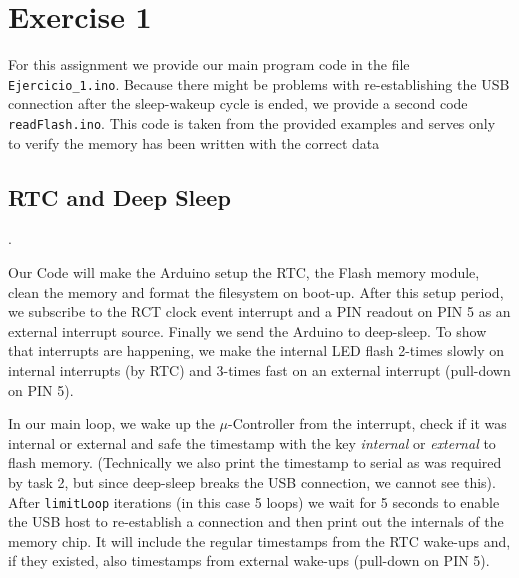 \chapter*{Exercise 1}

For this assignment we provide our main program code in the file \texttt{Ejercicio\_1.ino}. Because there might be problems with re-establishing the USB connection after the sleep-wakeup cycle is ended, we provide a second code \texttt{readFlash.ino}. This code is taken from the provided examples and serves only to verify the memory has been written with the correct data

\section*{RTC and Deep Sleep}.

Our Code will make the Arduino setup the RTC, the Flash memory module, clean the memory and format the filesystem on boot-up. After this setup period, we subscribe to the RCT clock event interrupt and a PIN readout on PIN 5 as an external interrupt source. Finally we send the Arduino to deep-sleep.
To show that interrupts are happening, we make the internal LED flash 2-times slowly on internal interrupts (by RTC) and 3-times fast on an external interrupt (pull-down on PIN 5).

In our main loop, we wake up the $\mu$-Controller from the interrupt, check if it was internal or external and safe the timestamp with the key \textsl{internal} or \textsl{external} to flash memory. (Technically we also print the timestamp to serial as was required by task 2, but since deep-sleep breaks the USB connection, we cannot see this). 
After \texttt{limitLoop} iterations (in this case 5 loops) we wait for 5 seconds to enable the USB host to re-establish a connection and then print out the internals of the memory chip. It will include the regular timestamps from the RTC wake-ups and, if they existed, also timestamps from external wake-ups (pull-down on PIN 5).